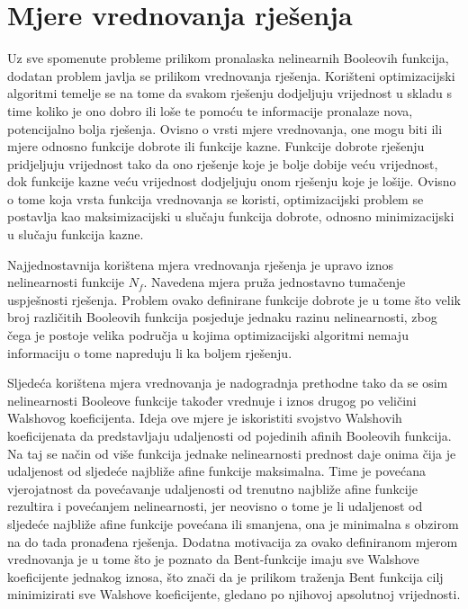 \section{Mjere vrednovanja rješenja}
Uz sve spomenute probleme prilikom pronalaska nelinearnih Booleovih funkcija, dodatan problem javlja se prilikom vrednovanja rješenja.
Korišteni optimizacijski algoritmi temelje se na tome da svakom rješenju dodjeljuju vrijednost u skladu s time koliko je ono dobro ili loše te pomoću te informacije pronalaze nova, potencijalno bolja rješenja.
Ovisno o vrsti mjere vrednovanja, one mogu biti ili mjere odnosno funkcije dobrote ili funkcije kazne.
Funkcije dobrote rješenju pridjeljuju vrijednost tako da ono rješenje koje je bolje dobije veću vrijednost, dok funkcije kazne veću vrijednost dodjeljuju onom rješenju koje je lošije.
Ovisno o tome koja vrsta funkcija vrednovanja se koristi, optimizacijski problem se postavlja kao maksimizacijski u slučaju funkcija dobrote, odnosno minimizacijski u slučaju funkcija kazne.

Najjednostavnija korištena mjera vrednovanja rješenja je upravo iznos nelinearnosti funkcije $N_f$.
Navedena mjera pruža jednostavno tumačenje uspješnosti rješenja.
Problem ovako definirane funkcije dobrote je u tome što velik broj različitih Booleovih funkcija posjeduje jednaku razinu nelinearnosti, zbog čega je postoje velika područja u kojima optimizacijski algoritmi nemaju informaciju o tome napreduju li ka boljem rješenju.

Sljedeća korištena mjera vrednovanja je nadogradnja prethodne tako da se osim nelinearnosti 
Booleove funkcije također vrednuje i iznos drugog po veličini Walshovog koeficijenta.
Ideja ove mjere je iskoristiti svojstvo Walshovih koeficijenata da predstavljaju udaljenosti od pojedinih afinih Booleovih funkcija.
Na taj se način od više funkcija jednake nelinearnosti prednost daje onima čija je udaljenost od sljedeće najbliže afine funkcije maksimalna.
Time je povećana vjerojatnost da povećavanje udaljenosti od trenutno najbliže afine funkcije rezultira i povećanjem nelinearnosti, jer neovisno o tome je li udaljenost od sljedeće najbliže afine funkcije povećana ili smanjena, ona je minimalna s obzirom na do tada pronađena rješenja.
Dodatna motivacija za ovako definiranom mjerom vrednovanja je u tome što je poznato da Bent-funkcije imaju sve Walshove koeficijente jednakog iznosa, što znači da je prilikom traženja Bent funkcija cilj minimizirati sve Walshove koeficijente, gledano po njihovoj apsolutnoj vrijednosti.

